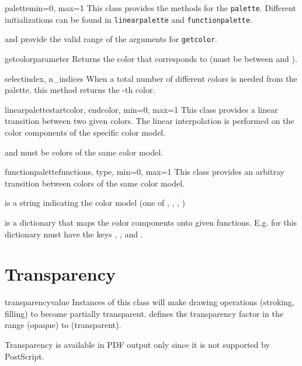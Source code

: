 \begin{classdesc}{palette}{min=0, max=1}
  This class provides the methods for the \verb|palette|. Different
  initializations can be found in \verb|linearpalette| and \verb|functionpalette|.

   and  provide the valid range of the arguments for
  \verb|getcolor|.

  \begin{funcdesc}{getcolor}{parameter}
    Returns the color that corresponds to  (must be between
     and ).
  \end{funcdesc}

  \begin{funcdesc}{select}{index, n\_indices}
    When a total number of  different colors is needed from the
    palette, this method returns the -th color.
  \end{funcdesc}

\end{classdesc}


\begin{classdesc}{linearpalette}{startcolor, endcolor, min=0, max=1}
  This class provides a linear transition between two given colors. The linear
  interpolation is performed on the color components of the specific color
  model.

   and  must be colors of the same color model.
\end{classdesc}

\begin{classdesc}{functionpalette}{functions, type, min=0, max=1}
  This class provides an arbitray transition between colors of the same
  color model.

   is a string indicating the color model (one of ,
  , , )

   is a dictionary that maps the color components onto given
  functions. E.g. for  this dictionary must have the keys
  , , and .

\end{classdesc}

\section{Transparency}

\begin{classdesc}{transparency}{value}
  Instances of this class will make drawing operations (stroking,
  filling) to become partially transparent.  defines the
  transparency factor in the range  (opaque) to 
  (transparent).

  Transparency is available in PDF output only since it is not
  supported by PostScript.
\end{classdesc}

